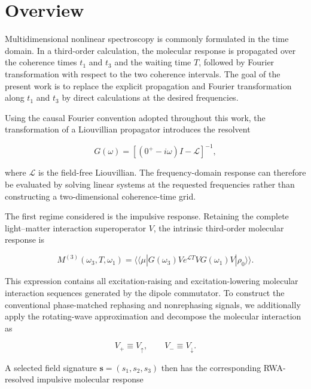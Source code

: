 \documentclass[11pt]{article}
\begin{document}
\tableofcontents

\newpage

\section{Overview}
\label{sec:overview}

Multidimensional nonlinear spectroscopy is commonly formulated in the
time domain. In a third-order calculation, the molecular response is
propagated over the coherence times $t_1$ and $t_3$ and the waiting
time $T$, followed by Fourier transformation with respect to the two
coherence intervals. The goal of the present work is to replace the
explicit propagation and Fourier transformation along $t_1$ and $t_3$
by direct calculations at the desired frequencies.

Using the causal Fourier convention adopted throughout this work, the
transformation of a Liouvillian propagator introduces the resolvent

\begin{equation}
\boxed{
G(\omega)
=
\left[
(0^{+}-i\omega)I-\mathcal{L}
\right]^{-1},
}
\end{equation}

where $\mathcal{L}$ is the field-free Liouvillian. The frequency-domain
response can therefore be evaluated by solving linear systems at the
requested frequencies rather than constructing a two-dimensional
coherence-time grid.

The first regime considered is the impulsive response. Retaining the
complete light--matter interaction superoperator $V$, the intrinsic
third-order molecular response is

\begin{equation}
\boxed{
M^{(3)}
(\omega_3,T,\omega_1)
=
\langle\!\langle\mu|
G(\omega_3)
V
e^{\mathcal{L}T}
V
G(\omega_1)
V
|\rho_0\rangle\rangle .
}
\end{equation}

This expression contains all excitation-raising and
excitation-lowering molecular interaction sequences generated by the
dipole commutator. To construct the conventional phase-matched
rephasing and nonrephasing signals, we additionally apply the
rotating-wave approximation and decompose the molecular interaction as

\begin{equation}
V_{+}\equiv V_{\uparrow},
\qquad
V_{-}\equiv V_{\downarrow}.
\end{equation}

A selected field signature
$\mathbf{s}=(s_1,s_2,s_3)$ then has the corresponding RWA-resolved
impulsive molecular response
\end{document}
